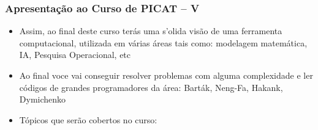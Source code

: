 \begin{frame}[fragile]
  \frametitle{Apresentação ao Curso de PICAT -- V}
  \begin{itemize}

						
    \item Assim, ao final deste curso terás uma s'olida visão  de uma ferramenta
    computacional, utilizada em várias áreas tais como: modelagem matemática, IA,
    Pesquisa Operacional, etc

    \pause
    \item Ao final voce vai conseguir resolver problemas com alguma complexidade e ler
    códigos de grandes programadores da área: Barták, Neng-Fa, Hakank, Dymichenko    
    
    \pause
    \item Tópicos  que serão cobertos no curso:
  \end{itemize}

\end{frame}

